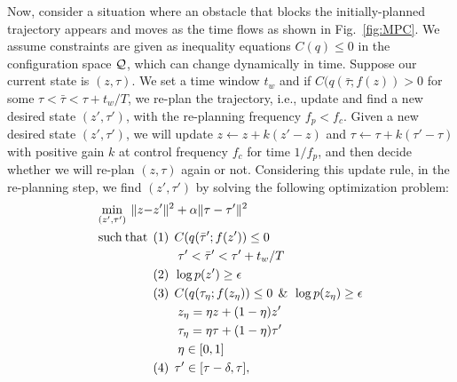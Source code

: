 Now, consider a situation where an obstacle that blocks the initially-planned trajectory appears and moves as the time flows as shown in Fig.~\ref{fig:MPC}. We assume constraints are given as inequality equations $C(q) \leq 0$ in the configuration space ${\cal Q}$, which can change dynamically in time. Suppose our current state is $(z,\tau)$. We set a time window $t_w$ and if $C(q(\bar{\tau}; f(z)) > 0$ for some $\tau < \bar{\tau} < \tau + t_w/T$, we re-plan the trajectory, i.e., update and find a new desired state $(z',\tau')$, with the re-planning frequency $f_p < f_c$. 
Given a new desired state $(z', \tau')$, we will update $z \xleftarrow{} z + k (z'-z)$ and $\tau \xleftarrow{} \tau + k (\tau'-\tau)$ with positive gain $k$ at control frequency $f_c$ for time $1/f_p$, and then decide whether we will re-plan $(z,\tau)$ again or not. Considering this update rule, in the re-planning step, we find $(z',\tau')$ by solving the following optimization problem:
\begin{align}
\label{eq:mpc_sa}
    \min_{(z', \tau')}  \: \|z - &z'\|^2  + \alpha \|\tau - \tau'\|^2 \\
    {\rm such} \: {\rm that} \:\: & {\rm (1)} \:\: C(q(\bar{\tau}'; f(z')) \leq 0 \nonumber \\ 
    & \:\:\:\:\:\:\:\:\: \tau' < \bar{\tau}' < \tau' + t_w/T \nonumber \\
    & {\rm (2)} \:\: \log p(z') \geq \epsilon \nonumber \\ 
    & {\rm (3)} \:\:  C(q(\tau_{\eta}; f(z_\eta)) \leq 0 \:\: \& \:\: \log p(z_\eta) \geq \epsilon \nonumber \\ 
    & \:\:\:\:\:\:\:\:\: z_\eta=\eta z + (1-\eta) z' \nonumber \\ 
    & \:\:\:\:\:\:\:\:\: \tau_\eta = \eta \tau + (1-\eta)\tau' \nonumber \\
    & \:\:\:\:\:\:\:\:\: \eta \in [0,1] \nonumber \\
    & {\rm (4)} \:\: \tau' \in [\tau - \delta, \tau] \nonumber, 
\end{align}

